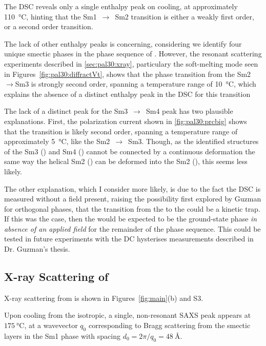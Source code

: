 \documentclass[aagreenthesis]{subfiles}
\begin{document}
The DSC reveals only a single enthalpy peak on cooling, at approximately
\SI{110}{\degreeCelsius}, hinting that the
Sm1~$\rightarrow$~Sm2 transition is either a weakly first order, or a second
order transition.


The lack of other enthalpy peaks is concerning, considering we identify four
unique smectic phases in the phase sequence of \nfour{}. However, the
resonant scattering experiments described in \autoref{sec:pal30:xray},
particulary the soft-melting mode seen in Figures~\ref{fig:pal30:diffractVt},
shows that the phase transition from the
Sm2~$\rightarrow$Sm3 is strongly second order, spanning a temperature range
of \SI{10}{\degreeCelsius}, which explains the absence of a distinct enthalpy peak in
the DSC for this transition 

The lack of a distinct peak for the Sm3~$\rightarrow$~Sm4 peak has two
plausible explanations. First, the polarization current shown in
\autoref{fig:pal30:prcbig} shows that the
transition is likely second order, spanning a temperature range of
approximately \SI{5}{\degreeCelsius}, like the
Sm2~$\rightarrow$~Sm3. Though, as the identified structures of the Sm3
(\smcapa{}) and Sm4 (\smcapf{})
cannot be connected by a continuous deformation the same way the helical Sm2
(\smcpalpha{}) can be deformed into the Sm2 (\smcapa{}), this seems less
likely. 

The other explanation, which I consider more likely, is due to the fact the DSC
is measured
without a field present, raising the possibility first explored by
Guzman\cite{edThesis} for orthogonal phases, that the transition from the \smcapa{} to the
\smcapf{} could be a kinetic trap. If this was the case, then the
\smcapa{} would be expected to be the ground-state phase \textit{in absence
of an applied field} for the remainder of
the phase sequence. This could be tested in future experiments with
the DC hysterises measurements described in Dr. Guzman's
thesis\cite{edThesis}.



\subsection{X-ray Scattering of \nfour{}}
\label{sec:pal30:xray}
X-ray scattering from  is shown in Figures~\ref{fig:main}(b) and S3.

Upon  cooling from the isotropic, a single, non-resonant SAXS peak
appears at $\SI{175}{\degreeCelsius}$, at a wavevector $q_0$  corresponding to Bragg scattering from
the smectic layers in the Sm1 phase with spacing $d_0 = 2\pi/q_0
= \SI{48}{\angstrom}$. 
\end{document}
